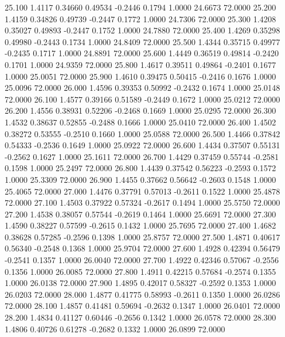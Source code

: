   25.100   1.4117   0.34660   0.49534  -0.2446   0.1794   1.0000  24.6673  72.0000
  25.200   1.4159   0.34826   0.49739  -0.2447   0.1772   1.0000  24.7306  72.0000
  25.300   1.4208   0.35027   0.49893  -0.2447   0.1752   1.0000  24.7880  72.0000
  25.400   1.4269   0.35298   0.49980  -0.2443   0.1734   1.0000  24.8409  72.0000
  25.500   1.4344   0.35715   0.49977  -0.2435   0.1717   1.0000  24.8891  72.0000
  25.600   1.4449   0.36519   0.49814  -0.2420   0.1701   1.0000  24.9359  72.0000
  25.800   1.4617   0.39511   0.49864  -0.2401   0.1677   1.0000  25.0051  72.0000
  25.900   1.4610   0.39475   0.50415  -0.2416   0.1676   1.0000  25.0096  72.0000
  26.000   1.4596   0.39353   0.50992  -0.2432   0.1674   1.0000  25.0148  72.0000
  26.100   1.4577   0.39166   0.51589  -0.2449   0.1672   1.0000  25.0212  72.0000
  26.200   1.4556   0.38931   0.52206  -0.2468   0.1669   1.0000  25.0295  72.0000
  26.300   1.4532   0.38637   0.52855  -0.2488   0.1666   1.0000  25.0410  72.0000
  26.400   1.4502   0.38272   0.53555  -0.2510   0.1660   1.0000  25.0588  72.0000
  26.500   1.4466   0.37842   0.54333  -0.2536   0.1649   1.0000  25.0922  72.0000
  26.600   1.4434   0.37507   0.55131  -0.2562   0.1627   1.0000  25.1611  72.0000
  26.700   1.4429   0.37459   0.55744  -0.2581   0.1598   1.0000  25.2497  72.0000
  26.800   1.4439   0.37542   0.56223  -0.2593   0.1572   1.0000  25.3309  72.0000
  26.900   1.4455   0.37662   0.56642  -0.2603   0.1548   1.0000  25.4065  72.0000
  27.000   1.4476   0.37791   0.57013  -0.2611   0.1522   1.0000  25.4878  72.0000
  27.100   1.4503   0.37922   0.57324  -0.2617   0.1494   1.0000  25.5750  72.0000
  27.200   1.4538   0.38057   0.57544  -0.2619   0.1464   1.0000  25.6691  72.0000
  27.300   1.4590   0.38227   0.57599  -0.2615   0.1432   1.0000  25.7695  72.0000
  27.400   1.4682   0.38628   0.57285  -0.2596   0.1398   1.0000  25.8757  72.0000
  27.500   1.4871   0.40617   0.56340  -0.2548   0.1368   1.0000  25.9704  72.0000
  27.600   1.4928   0.42394   0.56479  -0.2541   0.1357   1.0000  26.0040  72.0000
  27.700   1.4922   0.42346   0.57067  -0.2556   0.1356   1.0000  26.0085  72.0000
  27.800   1.4911   0.42215   0.57684  -0.2574   0.1355   1.0000  26.0138  72.0000
  27.900   1.4895   0.42017   0.58327  -0.2592   0.1353   1.0000  26.0203  72.0000
  28.000   1.4877   0.41775   0.58993  -0.2611   0.1350   1.0000  26.0286  72.0000
  28.100   1.4857   0.41481   0.59694  -0.2632   0.1347   1.0000  26.0401  72.0000
  28.200   1.4834   0.41127   0.60446  -0.2656   0.1342   1.0000  26.0578  72.0000
  28.300   1.4806   0.40726   0.61278  -0.2682   0.1332   1.0000  26.0899  72.0000
